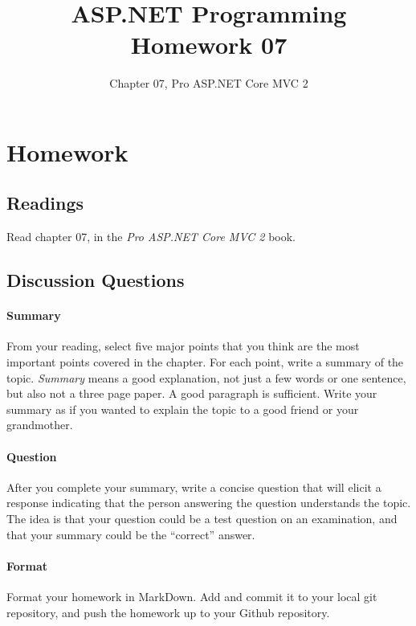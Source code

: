 \documentclass{article}
\title{ASP.NET Programming Homework 07}
\author{Chapter 07, Pro ASP.NET Core MVC 2}
\date{}
\begin{document}
    

    \maketitle{}
    \thispagestyle{fancy}

    \section*{Homework}

        \subsection*{Readings}

        Read chapter 07, in the \textit{Pro ASP.NET Core MVC 2} book.
        
        \subsection*{Discussion Questions}

        \paragraph{Summary} From your reading, select five major points that you think are the most important points covered in the chapter. For each point, write a summary of the topic. \textit{Summary} means a good explanation, not just a few words or one sentence, but also not a three page paper. A good paragraph is sufficient. Write your summary as if you wanted to explain the topic to a good friend or your grandmother. 

        \paragraph{Question} After you complete your summary, write a concise question that will elicit a response indicating that the person answering the question understands the topic. The idea is that your question could be a test question on an examination, and that your summary could be the ``correct'' answer.

        \paragraph{Format} Format your homework in MarkDown. Add and commit it to your local git repository, and push the homework up to your Github repository.
\end{document}
